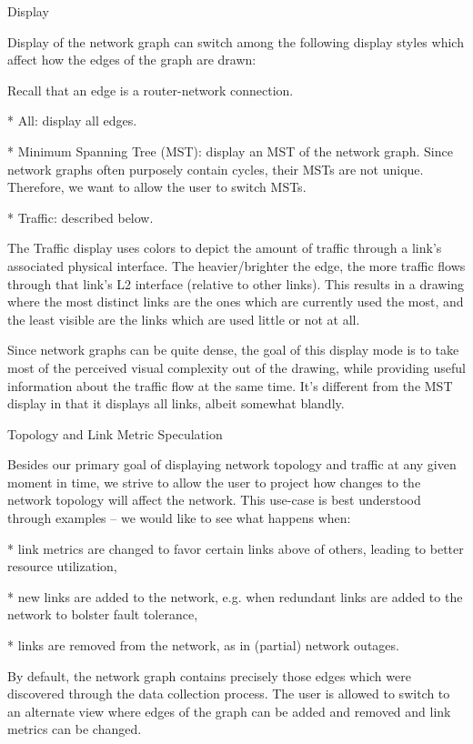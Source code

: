 \enditems

\secc Display

Display of the network graph can switch among the following display styles which
affect how the edges of the graph are drawn:

Recall that an edge is a router-network connection.

\begitems

* All: display all edges.

* Minimum Spanning Tree (MST): display an MST of the network graph. Since network
graphs often purposely contain cycles, their MSTs are not unique. Therefore, we
want to allow the user to switch MSTs.

* Traffic: described below.

\enditems

The Traffic display uses colors to depict the amount of traffic through a
link's associated physical interface. The heavier/brighter the edge, the more
traffic flows through that link's L2 interface (relative to other links). This
results in a drawing where the most distinct links are the ones which are
currently used the most, and the least visible are the links which are used
little or not at all.

Since network graphs can be quite dense, the goal of this display mode is to
take most of the perceived visual complexity out of the drawing, while
providing useful information about the traffic flow at the same time. It's
different from the MST display in that it displays all links, albeit somewhat
blandly.

\secc Topology and Link Metric Speculation

Besides our primary goal of displaying network topology and traffic at any
given moment in time, we strive to allow the user to project how changes to the
network topology will affect the network. This use-case is best understood
through examples -- we would like to see what happens when:

\begitems

* link metrics are changed to favor certain links above of others, leading to
better resource utilization,

* new links are added to the network, e.g. when redundant links are added to the
network to bolster fault tolerance,

* links are removed from the network, as in (partial) network outages.

\enditems

By default, the network graph contains precisely those edges which were
discovered through the data collection process. The user is allowed to switch to
an alternate view where edges of the graph can be added and removed and link
metrics can be changed.


